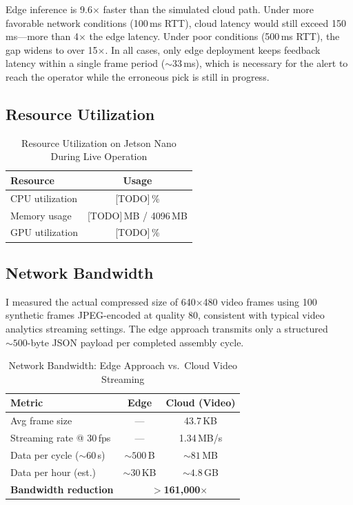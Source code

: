\documentclass[conference]{IEEEtran}
\begin{document}
Edge inference is 9.6$\times$ faster than the simulated cloud path. Under more favorable network conditions (100\,ms RTT), cloud latency would still exceed 150\,ms---more than 4$\times$ the edge latency. Under poor conditions (500\,ms RTT), the gap widens to over 15$\times$. In all cases, only edge deployment keeps feedback latency within a single frame period (${\sim}33$\,ms), which is necessary for the alert to reach the operator while the erroneous pick is still in progress.

\subsection{Resource Utilization}

\begin{table}[htbp]
\caption{Resource Utilization on Jetson Nano During Live Operation}
\label{tab:resources}
\centering
\begin{tabular}{lc}
\toprule
\textbf{Resource} & \textbf{Usage} \\
\midrule
CPU utilization & [TODO]\,\% \\
Memory usage & [TODO]\,MB / 4096\,MB \\
GPU utilization & [TODO]\,\% \\
\bottomrule
\end{tabular}
\end{table}

\subsection{Network Bandwidth}

I measured the actual compressed size of 640$\times$480 video frames using 100 synthetic frames JPEG-encoded at quality 80, consistent with typical video analytics streaming settings. The edge approach transmits only a structured ${\sim}500$-byte JSON payload per completed assembly cycle.

\begin{table}[htbp]
\caption{Network Bandwidth: Edge Approach vs.\ Cloud Video Streaming}
\label{tab:bandwidth}
\centering
\begin{tabular}{lcc}
\toprule
\textbf{Metric} & \textbf{Edge} & \textbf{Cloud (Video)} \\
\midrule
Avg frame size & --- & 43.7\,KB \\
Streaming rate @ 30\,fps & --- & 1.34\,MB/s \\
Data per cycle (${\sim}60$\,s) & ${\sim}500$\,B & ${\sim}81$\,MB \\
Data per hour (est.) & ${\sim}30$\,KB & ${\sim}4.8$\,GB \\
\textbf{Bandwidth reduction} & \multicolumn{2}{c}{\textbf{$>$161{,}000$\times$}} \\
\bottomrule
\end{tabular}
\end{table}
\end{document}

